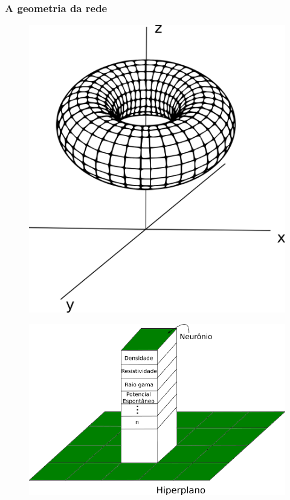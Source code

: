 \documentclass[10pt]{beamer} %
\begin{document}
\begin{frame}
	\frametitle{A geometria da rede}
	
\begin{figure}[H]
		\flushleft
		\includegraphics[scale=0.2]{Imagens/toro.png}
		\label{toro}
\end{figure}
\begin{figure}[H]
	\flushright
		\includegraphics[scale=0.35]{Imagens/hiperplano.png}
	\label{hiperplano}
\end{figure}

\end{frame}
\end{document}
